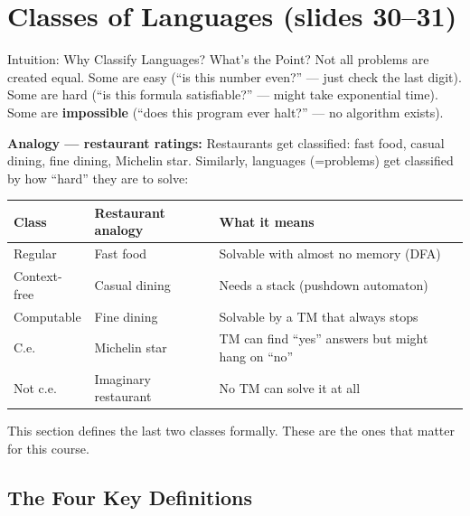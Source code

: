 \documentclass[11pt,a4paper]{article}
\begin{document}
\newpage
\section{Classes of Languages (slides 30--31)}

\begin{conceptbox}{Intuition: Why Classify Languages? What's the Point?}
Not all problems are created equal. Some are easy (``is this number even?'' --- just check the last digit). Some are hard (``is this formula satisfiable?'' --- might take exponential time). Some are \textbf{impossible} (``does this program ever halt?'' --- no algorithm exists).

\textbf{Analogy --- restaurant ratings:} Restaurants get classified: fast food, casual dining, fine dining, Michelin star. Similarly, languages (=problems) get classified by how ``hard'' they are to solve:

\begin{center}
\begin{tabular}{lll}
\toprule
\textbf{Class} & \textbf{Restaurant analogy} & \textbf{What it means} \\
\midrule
Regular & Fast food & Solvable with almost no memory (DFA) \\
Context-free & Casual dining & Needs a stack (pushdown automaton) \\
Computable & Fine dining & Solvable by a TM that always stops \\
C.e. & Michelin star & TM can find ``yes'' answers but might hang on ``no'' \\
Not c.e. & Imaginary restaurant & No TM can solve it at all \\
\bottomrule
\end{tabular}
\end{center}

This section defines the last two classes formally. These are the ones that matter for this course.
\end{conceptbox}

\subsection{The Four Key Definitions}
\end{document}
